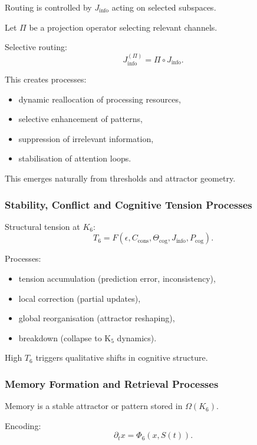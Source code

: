 Routing is controlled by $J_{\text{info}}$ acting on selected subspaces.

Let $\Pi$ be a projection operator selecting relevant channels.

Selective routing:
\[
J_{\text{info}}^{(\Pi)} = \Pi \circ J_{\text{info}}.
\]

This creates processes:
\begin{itemize}
    \item dynamic reallocation of processing resources,
    \item selective enhancement of patterns,
    \item suppression of irrelevant information,
    \item stabilisation of attention loops.
\end{itemize}

This emerges naturally from thresholds and attractor geometry.

\subsubsection{Stability, Conflict and Cognitive Tension Processes}

Structural tension at $K_6$:
\[
T_6 = F(\epsilon, C_{\text{cons}}, \Theta_{\text{cog}}, J_{\text{info}}, P_{\text{cog}}).
\]

Processes:
\begin{itemize}
    \item tension accumulation (prediction error, inconsistency),
    \item local correction (partial updates),
    \item global reorganisation (attractor reshaping),
    \item breakdown (collapse to K$_5$ dynamics).
\end{itemize}

High $T_6$ triggers qualitative shifts in cognitive structure.

\subsubsection{Memory Formation and Retrieval Processes}

Memory is a stable attractor or pattern stored in $\Omega(K_6)$.

Encoding:
\[
\partial_t x = \Phi_6(x, S(t)).
\]

